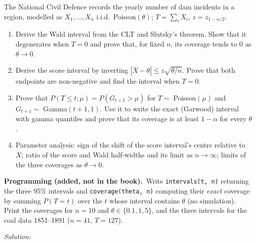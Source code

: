 \documentclass[11pt,a4paper]{article}
\newif\ifsolucoes
\newcommand{\espacoresol}{4.5cm}   %
\numberwithin{equation}{questao}   %
\newcommand{\programacao}{\par\smallskip\noindent\textbf{Programming (added, not in the book).}~}
\newcommand{\resolespaco}{\ifsolucoes\else\par\textit{Solution:}\vspace{\espacoresol}\par\fi}
\newcommand{\1}{\mathbf{1}}
\begin{document}
The National Civil Defence records the yearly number of dam incidents in a region, modelled as
$X_1,\dots,X_n$ i.i.d.\ Poisson$(\theta)$; $T=\sum_iX_i$, $z=z_{1-\alpha/2}$.
\begin{enumerate}[label=\textbf{(\alph*)},leftmargin=2.4em]
\item Derive the Wald interval from the CLT and Slutsky's theorem. Show that it degenerates when
$T=0$ and prove that, for fixed $n$, its coverage tends to $0$ as $\theta\to0$.
\item Derive the score interval by inverting $|\overline X-\theta|\le z\sqrt{\theta/n}$. Prove that
both endpoints are non-negative and find the interval when $T=0$.
\item Prove that $P(T\le t;\mu)=P(G_{t+1}>\mu)$ for $T\sim$ Poisson$(\mu)$ and $G_{t+1}\sim$
Gamma$(t+1,1)$. Use it to write the exact (Garwood) interval with gamma quantiles and prove that its
coverage is at least $1-\alpha$ for every $\theta$.
\item Parameter analysis: sign of the shift of the score interval's centre relative to
$\overline X$; ratio of the score and Wald half-widths and its limit as $n\to\infty$; limits of the
three coverages as $\theta\to0$.
\end{enumerate}
\programacao Write \texttt{intervals(t, n)} returning the three 95\% intervals and
\texttt{coverage(theta, n)} computing their \emph{exact} coverage by summing $P(T=t)$ over the
$t$ whose interval contains $\theta$ (no simulation). Print the coverages for $n=10$ and
$\theta\in\{0.1,1,5\}$, and the three intervals for the coal data 1851--1891 ($n=41$, $T=127$).
\resolespaco
\end{document}
